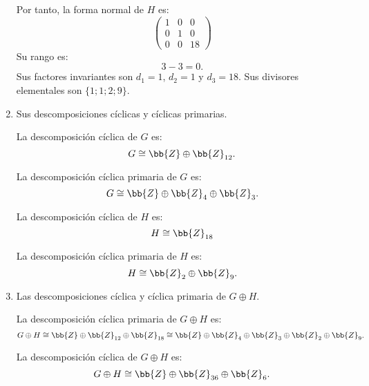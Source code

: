 \begin{ejercicio}
\begin{enumerate}
        Por tanto, la forma normal de $H$ es:
        \begin{equation*}
            \begin{pmatrix}
                1 & 0 & 0 \\
                0 & 1 & 0 \\
                0 & 0 & 18
            \end{pmatrix}
        \end{equation*}
        Su rango es:
        \begin{equation*}
            3-3= 0.
        \end{equation*}
        Sus factores invariantes son $d_1=1$, $d_2=1$ y $d_3=18$.
        Sus divisores elementales son $\{1; 1; 2; 9\}$.


        \item Sus descomposiciones cíclicas y cíclicas primarias.
        
        La descomposición cíclica de $G$ es:
        \begin{equation*}
            G \cong \bb{Z} \oplus \bb{Z}_{12}.
        \end{equation*}

        La descomposición cíclica primaria de $G$ es:
        \begin{equation*}
            G \cong \bb{Z} \oplus \bb{Z}_4 \oplus \bb{Z}_3.
        \end{equation*}

        La descomposición cíclica de $H$ es:
        \begin{equation*}
            H \cong \bb{Z}_{18}
        \end{equation*}

        La descomposición cíclica primaria de $H$ es:
        \begin{equation*}
            H \cong \bb{Z}_2 \oplus \bb{Z}_9.
        \end{equation*}
        \item Las descomposiciones cíclica y cíclica primaria de $G \oplus H$.
        
        La descomposición cíclica primaria de $G \oplus H$ es:
        \begin{equation*}
            G \oplus H \cong \bb{Z} \oplus \bb{Z}_{12} \oplus \bb{Z}_{18} \cong \bb{Z} \oplus \bb{Z}_4 \oplus \bb{Z}_3 \oplus \bb{Z}_2 \oplus \bb{Z}_9.
        \end{equation*}

        La descomposición cíclica de $G \oplus H$ es:
        \begin{equation*}
            G \oplus H \cong \bb{Z} \oplus \bb{Z}_{36} \oplus \bb{Z}_{6}.
        \end{equation*}
    \end{enumerate}
\end{ejercicio}

